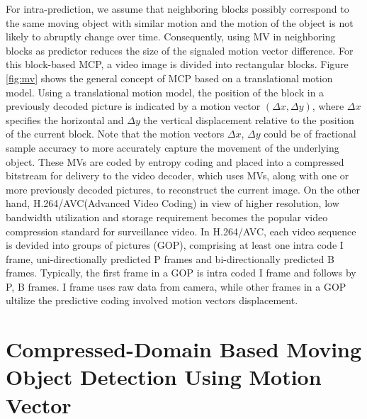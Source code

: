 For intra-prediction, we assume that neighboring blocks possibly correspond to the same moving object with similar motion and the motion of the object is not likely to abruptly change over time. Consequently, using MV in neighboring blocks as predictor reduces the size of the signaled motion vector difference. For this block-based MCP, a video image is divided into rectangular blocks. Figure \ref{fig:mv} shows the general concept of MCP based on a translational motion model. Using a translational motion model, the position of the block in a previously decoded picture is indicated by a motion vector $(\Delta x, \Delta y)$, where $\Delta x$ specifies the horizontal and $\Delta y$ the vertical displacement relative to the position of the current block. Note that the motion vectors $\Delta x$, $\Delta y$ could be of fractional sample accuracy to more accurately capture the movement of the underlying object. These MVs are coded by entropy coding and placed into a compressed bitstream for delivery to the video decoder, which uses MVs, along with one or more previously decoded pictures, to reconstruct the current image. On the other hand, H.264/AVC(Advanced Video Coding) in view of higher resolution, low bandwidth utilization and storage requirement becomes the popular video compression standard for surveillance video. In H.264/AVC, each video sequence is devided into groups of pictures (GOP), comprising at least one intra code I frame, uni-directionally predicted P frames and bi-directionally predicted B frames. Typically, the first frame in a GOP is intra coded I frame and follows by P, B frames. I frame uses raw data from camera, while other frames in a GOP ultilize the predictive coding involved motion vectors displacement. \\
\section{Compressed-Domain Based Moving Object Detection Using Motion Vector}




